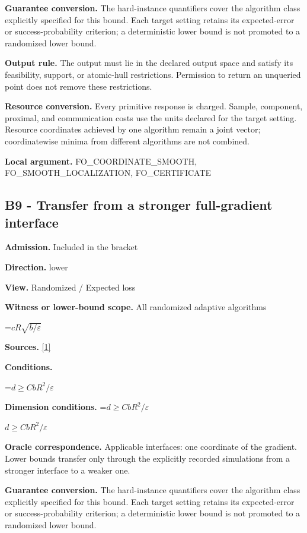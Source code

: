\documentclass[10pt,a4paper]{article}
\newcommand{\AtlasMath}[1]{\par\begingroup\centering\setbox0=\hbox{$\displaystyle #1$}\ifdim\wd0>1.4\linewidth\typeout{ATLAS WIDE FORMULA: \the\wd0}\fi\ifdim\wd0>\linewidth\resizebox{\linewidth}{!}{\box0}\else\box0\fi\par\endgroup}
\newcommand{\AtlasInlineMath}[1]{\begingroup\setbox0=\hbox{$#1$}\ifdim\wd0>.4\linewidth\endgroup\AtlasMath{#1}\else\endgroup$#1$\fi}
\begin{document}
\textbf{Guarantee conversion.} The hard-instance quantifiers cover the algorithm class explicitly specified for this bound. Each target setting retains its expected-error or success-probability criterion; a deterministic lower bound is not promoted to a randomized lower bound.

\textbf{Output rule.} The output must lie in the declared output space and satisfy its feasibility, support, or atomic-hull restrictions. Permission to return an unqueried point does not remove these restrictions.

\textbf{Resource conversion.} Every primitive response is charged. Sample, component, proximal, and communication costs use the units declared for the target setting. Resource coordinates achieved by one algorithm remain a joint vector; coordinatewise minima from different algorithms are not combined.

\textbf{Local argument.} FO\_\allowbreak{}COORDINATE\_\allowbreak{}SMOOTH, FO\_\allowbreak{}SMOOTH\_\allowbreak{}LOCALIZATION, FO\_\allowbreak{}CERTIFICATE

\subsection{B9 - Transfer from a stronger full-gradient interface}
\textbf{Admission.} Included in the bracket

\textbf{Direction.} lower

\textbf{View.} Randomized / Expected loss

\textbf{Witness or lower-bound scope.} All randomized adaptive algorithms

\AtlasMath{cR\sqrt{b/\varepsilon}}
\textbf{Sources.} \href{https://arxiv.org/pdf/2609.10874}{[1]}

\textbf{Conditions.} 
\AtlasMath{d\ge CbR^2/\varepsilon}


\textbf{Dimension conditions.} \AtlasInlineMath{d\ge CbR^2/\varepsilon}

\textbf{Oracle correspondence.} Applicable interfaces: one coordinate of the gradient. Lower bounds transfer only through the explicitly recorded simulations from a stronger interface to a weaker one.

\textbf{Guarantee conversion.} The hard-instance quantifiers cover the algorithm class explicitly specified for this bound. Each target setting retains its expected-error or success-probability criterion; a deterministic lower bound is not promoted to a randomized lower bound.
\end{document}
